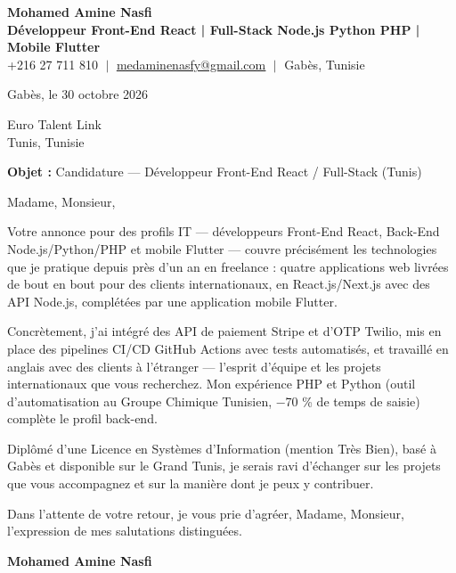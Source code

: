 \documentclass[11pt,a4paper]{article}
\begin{document}
\begin{center}
    \textbf{\Huge \color{navy} Mohamed Amine Nasfi} \\[3pt]
    \small \textbf{\color{accent} Développeur Front-End React | Full-Stack Node.js \textperiodcentered{} Python \textperiodcentered{} PHP | Mobile Flutter} \\[3pt]
    \footnotesize \color{greytext}
    +216 27 711 810 $\;|\;$
    \href{mailto:medaminenasfy@gmail.com}{\underline{medaminenasfy@gmail.com}} $\;|\;$
    Gabès, Tunisie
\end{center}

\vspace{8pt}
\hfill Gabès, le 30 octobre 2026

\vspace{12pt}
Euro Talent Link \\ Tunis, Tunisie

\vspace{10pt}
\textbf{Objet :} Candidature — Développeur Front-End React / Full-Stack (Tunis)

\vspace{4pt}
Madame, Monsieur,

Votre annonce pour des profils IT — développeurs Front-End React, Back-End Node.js/Python/PHP et mobile Flutter — couvre précisément les technologies que je pratique depuis près d'un an en freelance : quatre applications web livrées de bout en bout pour des clients internationaux, en React.js/Next.js avec des API Node.js, complétées par une application mobile Flutter.

Concrètement, j'ai intégré des API de paiement Stripe et d'OTP Twilio, mis en place des pipelines CI/CD GitHub Actions avec tests automatisés, et travaillé en anglais avec des clients à l'étranger — l'esprit d'équipe et les projets internationaux que vous recherchez. Mon expérience PHP et Python (outil d'automatisation au Groupe Chimique Tunisien, −70 \% de temps de saisie) complète le profil back-end.

Diplômé d'une Licence en Systèmes d'Information (mention Très Bien), basé à Gabès et disponible sur le Grand Tunis, je serais ravi d'échanger sur les projets que vous accompagnez et sur la manière dont je peux y contribuer.

Dans l'attente de votre retour, je vous prie d'agréer, Madame, Monsieur, l'expression de mes salutations distinguées.

\vspace{14pt}
\hfill \textbf{Mohamed Amine Nasfi}
\end{document}
